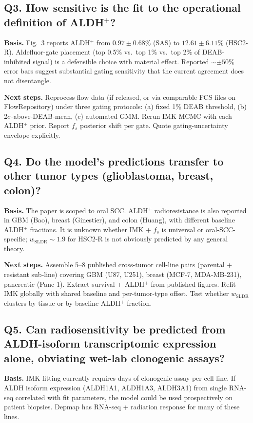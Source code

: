 \subsection*{Q3. How sensitive is the fit to the operational definition of ALDH$^{+}$?}

\textbf{Basis.} Fig.~3 reports ALDH$^{+}$ from $0.97 \pm 0.68\%$ (SAS) to $12.61 \pm 6.11\%$
(HSC2-R). Aldefluor-gate placement (top 0.5\% vs.\ top 1\% vs.\ top 2\% of DEAB-inhibited signal)
is a defensible choice with material effect. Reported $\sim \pm 50\%$ error bars suggest
substantial gating sensitivity that the current agreement does not disentangle.

\textbf{Next steps.} Reprocess flow data (if released, or via comparable FCS files on
FlowRepository) under three gating protocols: (a) fixed 1\% DEAB threshold, (b)
2$\sigma$-above-DEAB-mean, (c) automated GMM. Rerun IMK MCMC with each ALDH$^{+}$ prior. Report
$f_s$ posterior shift per gate. Quote gating-uncertainty envelope explicitly.

\subsection*{Q4. Do the model's predictions transfer to other tumor types
(glioblastoma, breast, colon)?}

\textbf{Basis.} The paper is scoped to oral SCC. ALDH$^{+}$ radioresistance is also reported in
GBM (Bao), breast (Ginestier), and colon (Huang), with different baseline ALDH$^{+}$ fractions.
It is unknown whether IMK + $f_s$ is universal or oral-SCC-specific; $w_{\mathrm{SLDR}} \sim 1.9$
for HSC2-R is not obviously predicted by any general theory.

\textbf{Next steps.} Assemble 5--8 published cross-tumor cell-line pairs (parental + resistant
sub-line) covering GBM (U87, U251), breast (MCF-7, MDA-MB-231), pancreatic (Panc-1). Extract
survival + ALDH$^{+}$ from published figures. Refit IMK globally with shared baseline and
per-tumor-type offset. Test whether $w_{\mathrm{SLDR}}$ clusters by tissue or by baseline
ALDH$^{+}$ fraction.

\subsection*{Q5. Can radiosensitivity be predicted from ALDH-isoform transcriptomic expression
alone, obviating wet-lab clonogenic assays?}

\textbf{Basis.} IMK fitting currently requires days of clonogenic assay per cell line. If ALDH
isoform expression (ALDH1A1, ALDH1A3, ALDH3A1) from single RNA-seq correlated with fit
parameters, the model could be used prospectively on patient biopsies. Depmap has RNA-seq +
radiation response for many of these lines.

